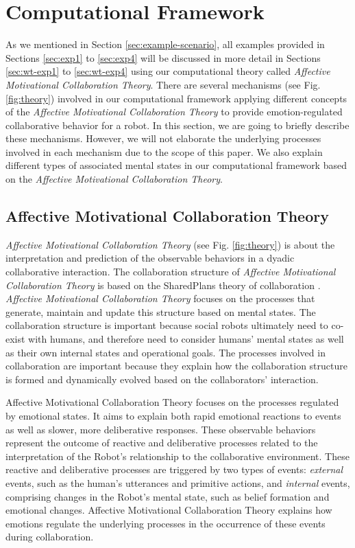 \section{Computational Framework}
\label{sec:computational-framework}

As we mentioned in Section \ref{sec:example-scenario}, all examples provided in
Sections \ref{sec:exp1} to \ref{sec:exp4} will be discussed in more detail in
Sections \ref{sec:wt-exp1} to \ref{sec:wt-exp4} using our computational theory
called \textit{Affective Motivational Collaboration Theory}. There are several
mechanisms (see Fig. \ref{fig:theory}) involved in our computational framework
applying different concepts of the \textit{Affective Motivational Collaboration
Theory} to provide emotion-regulated collaborative behavior for a robot. In this
section, we are going to briefly describe these mechanisms. However, we will not
elaborate the underlying processes involved in each mechanism due to the scope
of this paper. We also explain different types of associated mental states in
our computational framework based on the \textit{Affective Motivational
Collaboration Theory}.

\subsection{Affective Motivational Collaboration Theory}
\label{sec:AMCT}

\textit{Affective Motivational Collaboration Theory} (see Fig. \ref{fig:theory})
is about the interpretation and prediction of the observable behaviors in a
dyadic collaborative interaction. The collaboration structure of
\textit{Affective Motivational Collaboration Theory} is based on the SharedPlans
theory of collaboration
\cite{grosz:planning-acting,grosz:collaboration,grosz:plans-discourse}.
\textit{Affective Motivational Collaboration Theory} focuses on the processes
that generate, maintain and update this structure based on mental states. The
collaboration structure is important because social robots ultimately need to
co-exist with humans, and therefore need to consider humans' mental states as
well as their own internal states and operational goals. The processes involved
in collaboration are important because they explain how the collaboration
structure is formed and dynamically evolved based on the collaborators'
interaction.

Affective Motivational Collaboration Theory focuses on the processes regulated
by emotional states. It aims to explain both rapid emotional reactions to events
as well as slower, more deliberative responses. These observable behaviors
represent the outcome of reactive and deliberative processes related to the
interpretation of the Robot's relationship to the collaborative environment.
These reactive and deliberative processes are triggered by two types of events:
\textit{external} events, such as the human's utterances and primitive actions,
and \textit{internal} events, comprising changes in the Robot's mental state,
such as belief formation and emotional changes. Affective Motivational
Collaboration Theory explains how emotions regulate the underlying processes in
the occurrence of these events during collaboration.

